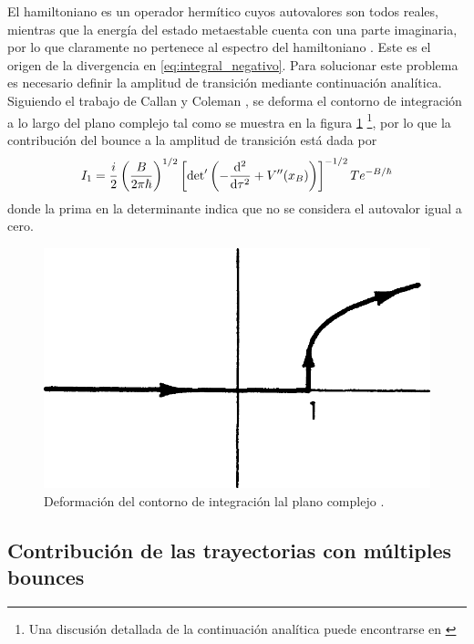 El hamiltoniano es un operador hermítico cuyos autovalores son todos reales, mientras que la energía del estado metaestable cuenta con una parte imaginaria, por lo que claramente no pertenece al espectro del hamiltoniano \cite{paranjape2017theory}. Este es el origen de la divergencia en \eqref{eq:integral_negativo}. Para solucionar este problema es necesario definir la amplitud de transición mediante continuación analítica. Siguiendo el trabajo de Callan y Coleman \cite{callan1977fate}, se deforma el contorno de integración a lo largo del plano complejo tal como se muestra en la figura \ref{fig:contorno} \footnote{Una discusión detallada de la continuación analítica puede encontrarse en \cite{andreassen2017precision, paranjape2017theory}},
por lo que la contribución del bounce a la amplitud de transición está dada por
\begin{equation} \label{eq:I_bounce}
I_1 =  \frac{i}{2}  \left( \frac{B}{2\pi \hbar} \right)^{1/2}  \left[ \textrm{det}' \left(-\dv[2]{}{\tau} + V''\qty(x_B) \right)\right]^{-1/2} T e^{-B/\hbar}
\end{equation}
donde la prima en la determinante indica que no se considera el autovalor igual a cero. 
\begin{figure}[h]
	\centering
	\includegraphics[scale=0.2]{FIGURAS/contorno}
	\caption{Deformación del contorno de integración lal plano complejo \cite{callan1977fate}.}
	\label{fig:contorno}
\end{figure}

\subsection{Contribución de las trayectorias con múltiples bounces}

